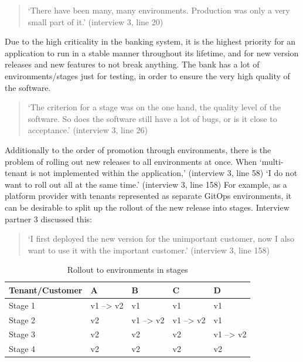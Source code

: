 \begin{quotation}
	\noindent
	\enquote*{There have been many, many environments. Production was only a very small part of it.}
	(interview 3, line 20)
\end{quotation}

Due to the high criticality in the banking system,
it is the highest priority for an application to run in a stable manner throughout its lifetime,
and for new version releases and new features to not break anything.
The bank has a lot of environments/stages just for testing, in order to ensure the
very high quality of the software.

\begin{quotation}
	\noindent
	\enquote*{The criterion for a stage was on the one hand, the quality level of the software. So does the software still have a lot of bugs, or is it close to acceptance.}
	(interview 3, line 26)
\end{quotation}

Additionally to the order of promotion through environments,
there is the problem of rolling out new releases to all environments at once.
When
\enquote*{multi-tenant is not implemented within the application,}
(interview 3, line 58)
\enquote*{I do not want to roll out all at the same time.}
(interview 3, line 158)
For example, as a platform provider with tenants represented as separate GitOps
environments, it can be desirable to split up the rollout of the new release into
stages. Interview partner 3 discussed this:

\begin{quotation}
	\noindent
	\enquote*{I first deployed the new version for the unimportant customer, now I also want to use it with the important customer.}
	(interview 3, line 158)
\end{quotation}

\begin{table}[h]
\begin{center}
\begin{tabular}{ |p{2.8cm}||p{1.5cm}|p{1.5cm}|p{1.5cm}|p{1.5cm}|  }
	\hline
	Tenant/Customer & A & B & C & D\\
	\hline
	Stage 1   & v1 --> v2    &v1&   v1 & v1\\
	Stage 2 &   v2  & v1 --> v2   & v1 --> v2 & v1\\
	Stage 3 &v2 & v2&  v2 & v1 --> v2 \\
	Stage 4 &v2 & v2&  v2 & v2\\
	\hline
\end{tabular}
\caption{Rollout to environments in stages}
\label{table:rollout-envs-stages}
\end{center}
\end{table}

